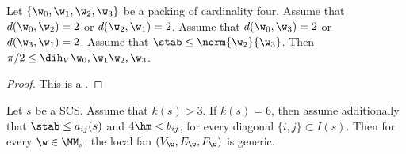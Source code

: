 \begin{lemma}\label{lemma:scs-obtuse}
Let $\{\w_0,\w_1,\w_2,\w_3\}$ be a packing of cardinality four.
Assume that $d(\w_0,\w_2)=2$ or $d(\w_2,\w_1)=2$.
Assume that $d(\w_0,\w_3)=2$ or $d(\w_3,\w_1)=2$.
Assume that $\stab\le \norm{\w_2}{\w_3}$.  Then
$\pi/2 \le \dih_V {\w_0,\w_1} {\w_2,\w_3}$.
\end{lemma}

\begin{proof} This is a .
\end{proof}

\begin{lemma}\label{lemma:bjo} 
Let $s$ be a SCS.
Assume that $k(s)>3$.
If $k(s)=6$, then assume additionally that
$\stab\le a_{i j}(s)$ and $4\hm < b_{i j}$, 
for every diagonal $\{i,j\}\subset I(s)$.
Then for every  $\w\in\MM_s$,  the local fan $(V_\w,E_\w,F_\w)$ is generic.
\end{lemma}

